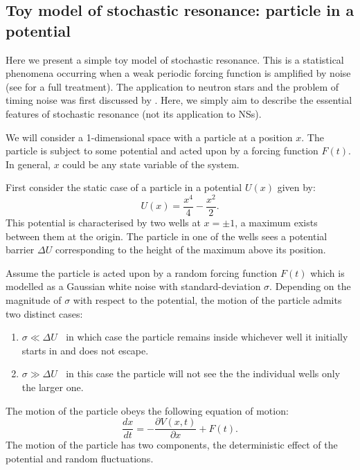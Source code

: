\documentclass[../full_thesis/full_thesis.tex]{subfiles}
\begin{document}
\begin{subappendices}
\section{Toy model of stochastic resonance: particle in a potential}
\label{app: stochastic}

Here we present a simple toy model of stochastic resonance. This is a
statistical phenomena occurring when a weak periodic forcing function is
amplified by noise (see \citet{Jung1991} for a full treatment). The application
to neutron stars and the problem of timing noise was first discussed by
\citet{Cordes2013}. Here, we simply aim to describe the essential features of
stochastic resonance (not its application to NSs).

We will consider a 1-dimensional space with a particle at a position $x$. The
particle is subject to some potential and acted upon by a forcing function
$F(t)$. In general, $x$ could be any state variable of the system.
 
First consider the static case of a particle in a potential $U(x)$  given by:
\begin{equation}
    U(x) = \frac{x^{4}}{4}-\frac{x^{2}}{2}.
\end{equation}
This potential is characterised by two wells at $x=\pm1$, a maximum exists
between them at the origin. The particle in one of the wells sees a potential
barrier $\Delta U$ corresponding to the height of the maximum above its
position.

Assume the particle is acted upon by a random forcing function $F(t)$ which is
modelled as a Gaussian white noise with standard-deviation $\sigma$. Depending on the
magnitude of $\sigma$ with respect to the potential, the motion of the particle
admits two distinct cases:
\begin{enumerate}
\item $\sigma \ll \Delta U \;\;$ in which case the particle remains inside whichever
    well it initially starts in and does not escape.
\item $\sigma \gg \Delta U \;\;$ in this case the particle will not see the the
    individual wells only the larger one.
\end{enumerate}

The motion of the particle obeys the following equation of motion:
\begin{equation}
    \frac{dx}{dt} = -\frac{\partial V(x,t)}{\partial x} + F(t).
\end{equation}
The motion of the particle has two components, the deterministic effect of the
potential and random fluctuations.


\end{subappendices}
\end{document}
